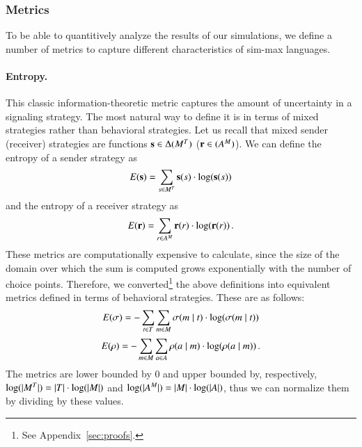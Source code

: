 \subsubsection{Metrics}
\label{sec:metrics}
To be able to quantitively analyze the results of our simulations, we define a number of metrics to capture different characteristics of sim-max languages.

\paragraph{Entropy.}
This classic information-theoretic metric captures the amount of uncertainty in a signaling strategy.
The most natural way to define it is in terms of mixed strategies rather than behavioral strategies.
Let us recall that mixed sender (receiver) strategies are functions $\mathrm{\mathbf{s}} \in \Delta(M^T)$ ($\mathrm{\mathbf{r}} \in (A^M)$).
We can define the entropy of a sender strategy as
\begin{align*}
  E(\mathrm{\mathbf{s}}) = \sum_{s \in M^T} \mathrm{\mathbf{s}}(s) \cdot \log(\mathrm{\mathbf{s}}(s))
\end{align*} 
and the entropy of a receiver strategy as
\begin{align*}
  E(\mathrm{\mathbf{r}}) = \sum_{r \in A^M} \mathrm{\mathbf{r}}(r) \cdot \log(\mathrm{\mathbf{r}}(r)) \,.
\end{align*} 
These metrics are computationally expensive to calculate, since the size of the domain over which the sum is computed grows exponentially with the number of choice points.
Therefore, we converted\footnote{See Appendix~\ref{sec:proofs}.} the above definitions into equivalent metrics defined in terms of behavioral strategies.
These are as follows:
\begin{align*}
  E(\sigma) = -\sum_{t \in T} \sum_{m \in M} \sigma(m \mid t) \cdot \log(\sigma(m \mid t))
\end{align*} 
\begin{align*}
  E(\rho) = -\sum_{m \in M} \sum_{a \in A} \rho(a \mid m) \cdot \log(\rho(a \mid m)) \,.
\end{align*}
The metrics are lower bounded by $0$ and upper bounded by, respectively, $\log(|M^T|) = |T| \cdot \log(|M|)$ and $\log(|A^M|) = |M| \cdot \log(|A|)$, thus we can normalize them by dividing by these values.

